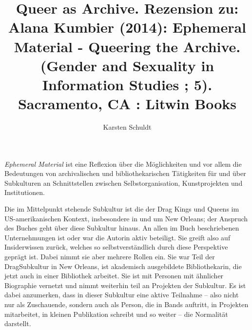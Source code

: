 \documentclass[a4paper,
fontsize=11pt,
oneside,
numbers=noperiodatend,
parskip=half-,
bibliography=totoc,
final
]{scrartcl}
\title{\LARGE{Queer as Archive. Rezension zu: Alana Kumbier (2014): Ephemeral Material - Queering the Archive. (Gender and Sexuality in Information Studies ; 5). Sacramento, CA : Litwin Books}} %
\author{Karsten Schuldt} %
\date{}
\begin{document}
\maketitle
\thispagestyle{fancyplain} 


\emph{Ephemeral Material} ist eine Reflexion über die Möglichkeiten und
vor allem die Bedeutungen von archivalischen und bibliothekarischen
Tätigkeiten für und über Subkulturen an Schnittstellen zwischen
Selbstorganisation, Kunstprojekten und Institutionen.

Die im Mittelpunkt stehende Subkultur ist die der Drag Kings und Queens
im US-a\-me\-ri\-ka\-nischen Kontext, insbesondere in und um New Orleans; der
Anspruch des Buches geht über diese Subkultur hinaus. An allen im Buch
beschriebenen Unternehmungen ist oder war die Autorin aktiv beteiligt.
Sie greift also auf Insiderwissen zurück, welches so selbstverständlich
durch diese Perspektive geprägt ist. Dabei nimmt sie aber mehrere Rollen
ein. Sie war Teil der Drag\-Sub\-kultur in New Orleans, ist akademisch
ausgebildete Bibliothekarin, die jetzt auch in einer Bibliothek
arbeitet. Sie ist mit Personen mit ähnlicher Biographie vernetzt und
nimmt weiterhin teil an Projekten der Subkultur. Es ist dabei
anzumerken, dass in dieser Subkultur eine aktive Teilnahme -- also nicht
nur als Zuschauende, sondern auch als Person, die in Bands auftritt, in
Projekten mitarbeitet, in kleinen Publikation schreibt und so weiter --
die Normalität darstellt.
\end{document}
